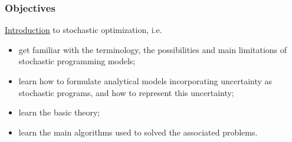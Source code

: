 \documentclass{beamer}
\begin{document}
\begin{frame}
\frametitle{Objectives}
 
\underline{Introduction} to stochastic optimization, i.e.
\begin{itemize}
\item
get familiar with the terminology, the possibilities and main limitations of stochastic programming models;
\item
learn how to formulate analytical models incorporating uncertainty as stochastic programs, and how to represent this uncertainty;
\item
learn the basic theory;
\item
learn the main algorithms used to solved the associated problems.
\end{itemize}
\end{frame}
\end{document}
